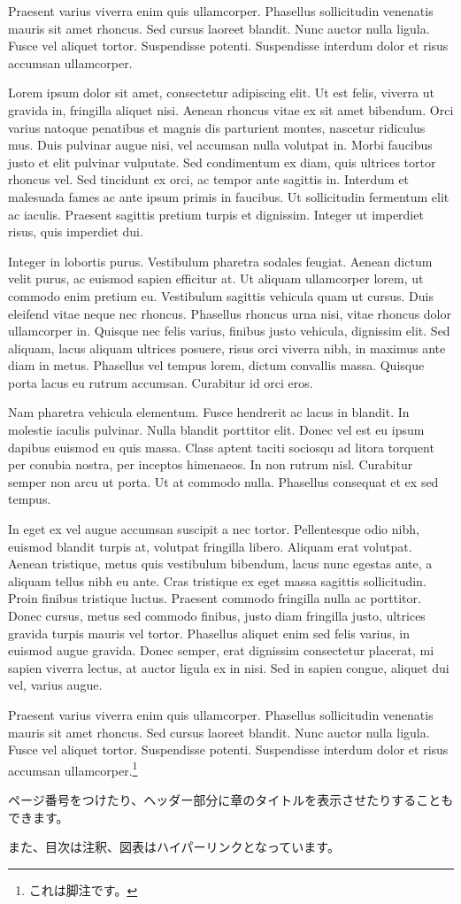 Praesent varius viverra enim quis ullamcorper. Phasellus sollicitudin venenatis mauris sit amet rhoncus. Sed cursus laoreet blandit. Nunc auctor nulla ligula. Fusce vel aliquet tortor. Suspendisse potenti. Suspendisse interdum dolor et risus accumsan ullamcorper.

Lorem ipsum dolor sit amet, consectetur adipiscing elit. Ut est felis, viverra ut gravida in, fringilla aliquet nisi. Aenean rhoncus vitae ex sit amet bibendum. Orci varius natoque penatibus et magnis dis parturient montes, nascetur ridiculus mus. Duis pulvinar augue nisi, vel accumsan nulla volutpat in. Morbi faucibus justo et elit pulvinar vulputate. Sed condimentum ex diam, quis ultrices tortor rhoncus vel. Sed tincidunt ex orci, ac tempor ante sagittis in. Interdum et malesuada fames ac ante ipsum primis in faucibus. Ut sollicitudin fermentum elit ac iaculis. Praesent sagittis pretium turpis et dignissim. Integer ut imperdiet risus, quis imperdiet dui.

Integer in lobortis purus. Vestibulum pharetra sodales feugiat. Aenean dictum velit purus, ac euismod sapien efficitur at. Ut aliquam ullamcorper lorem, ut commodo enim pretium eu. Vestibulum sagittis vehicula quam ut cursus. Duis eleifend vitae neque nec rhoncus. Phasellus rhoncus urna nisi, vitae rhoncus dolor ullamcorper in. Quisque nec felis varius, finibus justo vehicula, dignissim elit. Sed aliquam, lacus aliquam ultrices posuere, risus orci viverra nibh, in maximus ante diam in metus. Phasellus vel tempus lorem, dictum convallis massa. Quisque porta lacus eu rutrum accumsan. Curabitur id orci eros.

Nam pharetra vehicula elementum. Fusce hendrerit ac lacus in blandit. In molestie iaculis pulvinar. Nulla blandit porttitor elit. Donec vel est eu ipsum dapibus euismod eu quis massa. Class aptent taciti sociosqu ad litora torquent per conubia nostra, per inceptos himenaeos. In non rutrum nisl. Curabitur semper non arcu ut porta. Ut at commodo nulla. Phasellus consequat et ex sed tempus.

In eget ex vel augue accumsan suscipit a nec tortor. Pellentesque odio nibh, euismod blandit turpis at, volutpat fringilla libero. Aliquam erat volutpat. Aenean tristique, metus quis vestibulum bibendum, lacus nunc egestas ante, a aliquam tellus nibh eu ante. Cras tristique ex eget massa sagittis sollicitudin. Proin finibus tristique luctus. Praesent commodo fringilla nulla ac porttitor. Donec cursus, metus sed commodo finibus, justo diam fringilla justo, ultrices gravida turpis mauris vel tortor. Phasellus aliquet enim sed felis varius, in euismod augue gravida. Donec semper, erat dignissim consectetur placerat, mi sapien viverra lectus, at auctor ligula ex in nisi. Sed in sapien congue, aliquet dui vel, varius augue.

Praesent varius viverra enim quis ullamcorper. Phasellus sollicitudin venenatis mauris sit amet rhoncus. Sed cursus laoreet blandit. Nunc auctor nulla ligula. Fusce vel aliquet tortor. Suspendisse potenti. Suspendisse interdum dolor et risus accumsan ullamcorper.\footnote{これは脚注です。}

ページ番号をつけたり、ヘッダー部分に章のタイトルを表示させたりすることもできます。

また、目次は注釈、図表はハイパーリンクとなっています。